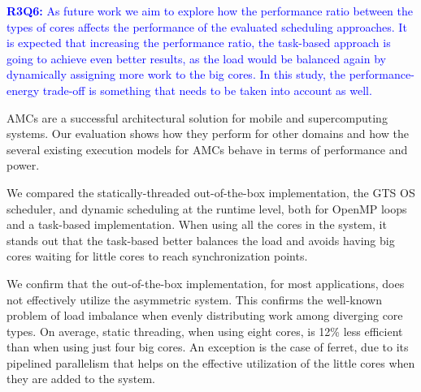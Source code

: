 \textcolor{blue}{
\textbf{R3Q6:} As future work we aim to explore how the performance ratio between the types of cores affects the performance of the evaluated scheduling approaches. 
It is expected that increasing the performance ratio, the task-based approach is going to achieve even better results, as the load would be balanced again by dynamically assigning more work to the big cores.
In this study, the performance-energy trade-off is something that needs to be taken into account as well.
}



\iffalse 
AMCs are a successful architectural solution for mobile and supercomputing systems. 
Our evaluation shows how they perform for other domains and how the several existing execution models for AMCs behave in terms of performance and power. 

We compared the statically-threaded out-of-the-box implementation, the GTS OS scheduler, and dynamic scheduling at the runtime level, both for OpenMP loops and a task-based implementation. 
When using all the cores in the system, it stands out that the task-based better balances the load and avoids having big cores waiting for little cores to reach synchronization points.

We confirm that the out-of-the-box implementation, for most applications, does not effectively utilize the asymmetric system.
This confirms the well-known problem of load imbalance when evenly distributing work among diverging core types. 
On average, static threading, when using eight cores, is 12\% less efficient than when using just four big cores.
An exception is the case of ferret, due to its pipelined parallelism that helps on the effective utilization of the little cores when they are added to the system.

